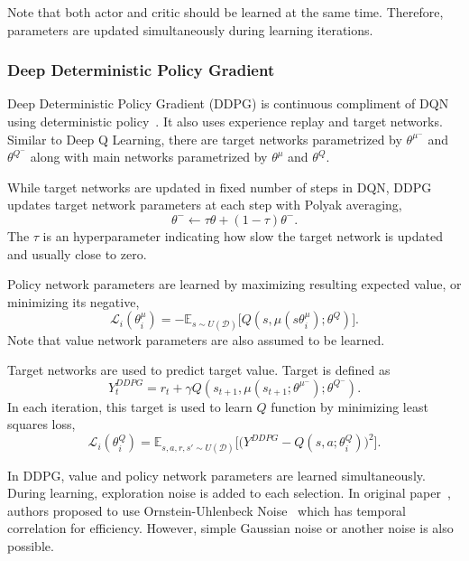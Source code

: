 Note that both actor and critic should be learned at the same time. Therefore, parameters are updated simultaneously during learning iterations. 

\subsubsection{Deep Deterministic Policy Gradient}
Deep Deterministic Policy Gradient (DDPG) is continuous compliment of DQN using deterministic policy~\cite{lillicrap_continuous_2019}. 
It also uses experience replay and target networks. 
Similar to Deep Q Learning, there are target networks parametrized by $\theta^{\mu^-}$ and $\theta^{Q^-}$ 
along with main networks parametrized by $\theta^{\mu}$ and $\theta^{Q}$. 

While target networks are updated in fixed number of steps in DQN, 
DDPG updates target network parameters at each step with Polyak averaging, 
\begin{equation}
\label{eqn:target_update}
\theta^- \leftarrow \tau \theta + (1-\tau) \theta^- .
\end{equation}
The $\tau$ is an hyperparameter indicating how slow the target network is updated and usually close to zero. 

Policy network parameters are learned by maximizing resulting expected value, or minimizing its negative,
\begin{equation}
\label{eqn:ddpg_policy_loss}
\mathcal{L}_i(\theta^\mu_i) = -\mathbb{E}_{s \sim U(\mathcal{D})} \Big[ Q(s, \mu(s\theta^\mu_i);\theta^Q) \Big].
\end{equation} 
Note that value network parameters are also assumed to be learned. 

Target networks are used to predict target value. Target is defined as 
\begin{equation}
\label{eqn:ddpg_target}
Y_t^{DDPG} = r_t + \gamma Q(s_{t+1}, \mu(s_{t+1};\theta^{\mu^-});\theta^{Q^-}).
\end{equation}
In each iteration, this target is used to learn $Q$ function by minimizing least squares loss, 
\begin{equation}
\label{eqn:ddpg_loss}
\mathcal{L}_i(\theta^Q_i) = \mathbb{E}_{s,a,r,s'\sim U(\mathcal{D})}\Big[\big( Y^{DDPG} - Q(s,a;\theta^Q_i) \big) ^ 2 \Big].
\end{equation}

In DDPG, value and policy network parameters are learned simultaneously. 
During learning, exploration noise is added to each selection. 
In original paper~\cite{lillicrap_continuous_2019}, authors proposed to use Ornstein-Uhlenbeck Noise~\cite{uhlenbeck_theory_1930} which has temporal correlation for efficiency. 
However, simple Gaussian noise or another noise is also possible. 

